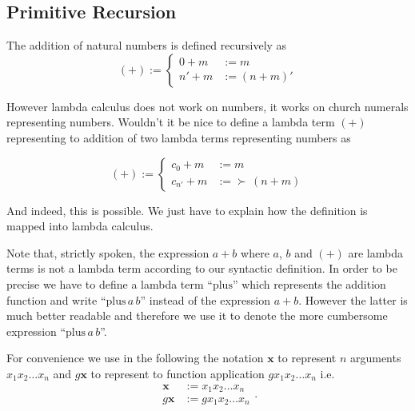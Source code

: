 \subsection{Primitive Recursion}

The addition of natural numbers is defined recursively as
$$
(+) :=
\begin{cases}
  0 + m &:= m \\
  n' + m &:= (n + m)'
\end{cases}
$$


However lambda calculus does not work on numbers, it works on church numerals
representing numbers. Wouldn't it be nice to define a lambda term $(+)$
representing to addition of two lambda terms representing numbers as

$$
(+) :=
\begin{cases}
  c_0 + m &:= m \\
  c_{n'} + m &:= \succ\, (n + m)
\end{cases}
$$

And indeed, this is possible. We just have to explain how the definition is
mapped into lambda calculus.

Note that, strictly spoken, the expression $a + b$ where $a$, $b$ and $(+)$
are lambda terms is not a lambda term according to our syntactic
definition. In order to be precise we have to define a lambda term
``$\text{plus}$'' which represents the addition function and write
``$\text{plus}\, a \, b$'' instead of the expression $a + b$. However the latter
is much better readable and therefore we use it to denote the more cumbersome
expression ``$\text{plus}\, a \, b$''.

For convenience we use in the following the notation $\mathbf{x}$ to represent
$n$ arguments $x_1 x_2\ldots x_n$ and $g \mathbf{x}$ to represent to
function application $g x_1 x_2 \ldots x_n$ i.e.
$$
\begin{array}{lll}
  \mathbf{x} & := x_1 x_2 \ldots x_n\\
  g \mathbf{x} & := g x_1 x_2 \ldots x_n
\end{array}
.
$$


